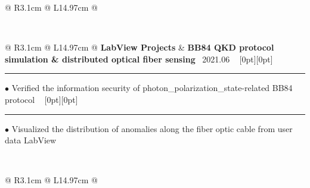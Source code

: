 {{\begin{tabularx}{\linewidth}{@{} R{3.1cm} @{\phantom{d}} L{14.97cm} @{}}
\end{tabularx}
\\
\begin{tabularx}{\linewidth}{@{} R{3.1cm} @{\phantom{d}} L{14.97cm} @{}}
	\textbf{LabView Projects} & \hspace{10pt} \textbf{BB84 QKD protocol simulation \& distributed optical fiber sensing} \hfill \textendash\ 2021.06 \newline \vspace{2pt} \ \hspace{-3pt} \raisebox{0.09\height}[0pt][0pt]{\vrule width0.5pt height30.0pt} \hspace{-0.26em}\rule[0.25em]{1.0em}{0.5pt}\!\! $\bullet$ {\small Verified the information security of photon\_polarization\_state-related BB84 protocol} \hfill \href{https://github.com/ChenZhu-Xie/postgraduate_courses/tree/master/3__2.2__Engineering_Course/2__2.2__Information_Technology_\%E2\%86\%90_RoamEdit\%2BLabView__1.0_year/\%E6\%88\%91\%E7\%9A\%84\%E8\%AF\%BE\%E8\%AE\%BE}{\color{black!50}\faGithub} \newline \vspace{-3pt} \ \hspace{-3pt} \raisebox{0.18\height}[0pt][0pt]{\vrule width0.5pt height15.0pt} \hspace{-0.26em}\rule[0.25em]{1.0em}{0.5pt}\!\! $\bullet$ {\small Visualized the distribution of anomalies along the fiber optic cable from user data} \hfill {\small \color{color-detail} LabView} \href{https://github.com/ChenZhu-Xie/postgraduate_courses/tree/master/3__2.2__Engineering_Course/3__2.3__Labview__1.0_year/\%E8\%99\%9A\%E6\%8B\%9F\%E4\%BB\%AA\%E5\%99\%A82021\%E8\%AF\%BE\%E8\%AE\%BE_\%E9\%80\%89\%E9\%A2\%98\%E4\%B8\%80_\%E8\%B0\%A2\%E5\%B0\%98\%E7\%AB\%B9}{\color{black!50}\faGithub} \\ \Gap\Gap\Gap
\end{tabularx}
\\
\begin{tabularx}{\linewidth}{@{} R{3.1cm} @{\phantom{d}} L{14.97cm} @{}}

\end{tabularx}}}
